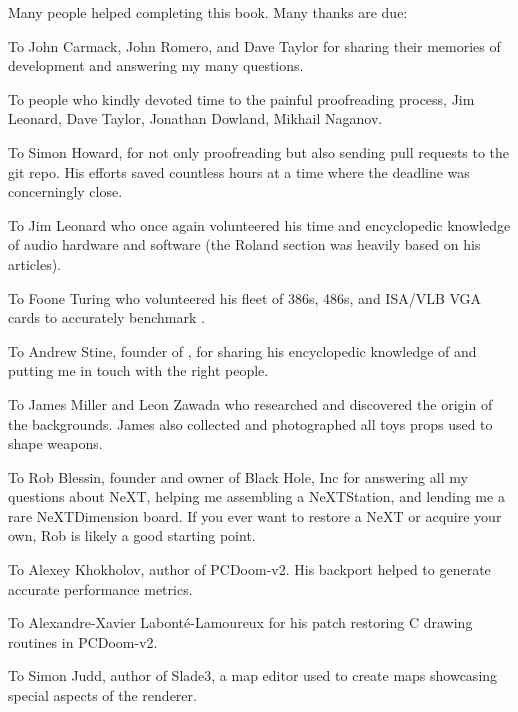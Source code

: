 Many people helped completing this book. Many thanks are due:\\
\par
To John Carmack, John Romero, and Dave Taylor for sharing their memories of \doom{} development and answering my many questions.\\
\par
To people who kindly devoted time to the painful proofreading process, Jim Leonard, Dave Taylor, Jonathan Dowland, Mikhail Naganov.\\
\par
To Simon Howard, for not only proofreading but also sending pull requests to the git repo. His efforts saved countless hours at a time where the deadline was
concerningly close.\\
\par
To Jim Leonard who once again volunteered his time and encyclopedic knowledge of audio hardware and software (the Roland section was heavily based on his articles).\\
\par
To Foone Turing who volunteered his fleet of 386s, 486s, and ISA/VLB VGA cards to accurately benchmark \doom{}.\\
\par
To Andrew Stine, founder of , for sharing his encyclopedic knowledge of \doom{} and putting me in touch with the right people.\\
\par
To James Miller and Leon Zawada who researched and discovered the origin of the backgrounds. James also collected and photographed all toys props used to shape \doom{} weapons.\\
\par
To Rob Blessin, founder and owner of Black Hole, Inc for answering all my questions about NeXT, helping me assembling a NeXTStation, and lending me a rare NeXTDimension board. If you ever want to restore a NeXT or acquire your own, Rob is likely a good starting point.\\
\par
To Alexey Khokholov, author of PCDoom-v2. His backport helped to generate accurate performance metrics.\\
\par
To Alexandre-Xavier Labont\'e-Lamoureux for his patch restoring C drawing routines in PCDoom-v2.\\
\par
To Simon Judd, author of Slade3, a map editor used to create maps showcasing special aspects of the renderer.\\
